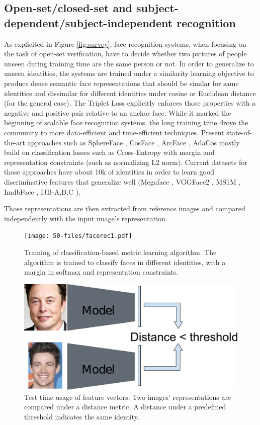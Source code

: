 \subsection{Open-set/closed-set and subject-dependent/subject-independent recognition}

As explicited in Figure \ref{fig:survey}, face recognition systems, when focusing on the task of open-set verification, have to decide whether two pictures of people unseen during training time are the same person or not. In order to generalize to unseen identities, the systems are trained under a similarity learning objective to produce dense semantic face representations that should be similar for same identities and dissimilar for different identities under cosine or Euclidean distance (for the general case). The Triplet Loss \cite{triplet,triplet-face} explicitly enforces those properties with a negative and positive pair relative to an anchor face. While it marked the beginning of scalable face recognition systems, the long training time drove the community to more data-efficient and time-efficient techniques. Present state-of-the-art approaches such as SphereFace \cite{sphereface}, CosFace \cite{cosface}, ArcFace \cite{arcface}, AdaCos \cite{adacos} mostly build on classification losses such as Cross-Entropy with margin and representation constraints (such as normalizing L2 norm). Current datasets  for those approaches have about 10k of identities in order to learn good discriminative features that generalize well (Megaface \cite{megaface}, VGGFace2 \cite{vggface2}, MS1M \cite{celeb1m}, ImdbFace \cite{imdbface}, IJB-{A,B,C} \cite{ijb-a, ijb-b, ijb-c}).

Those representations are then extracted from reference images and compared independently with the input image’s representation.

\begin{figure}
    \centering
    \texttt{[image: 50-files/facerec1.pdf]}
    \caption{Training of classification-based metric learning algorithm. The algorithm is trained to classify faces in different identities, with a margin in softmax and representation constraints.}
    \label{fig:facerec1}
\end{figure}

\begin{figure}
    \centering
    \includegraphics[width=\columnwidth]{50-files/facerec2.pdf}
    \caption{Test time usage of feature vectors. Two images’ representations are compared under a distance metric. A distance under a predefined threshold indicates the same identity.}
    \label{fig:facerec2}
\end{figure}


